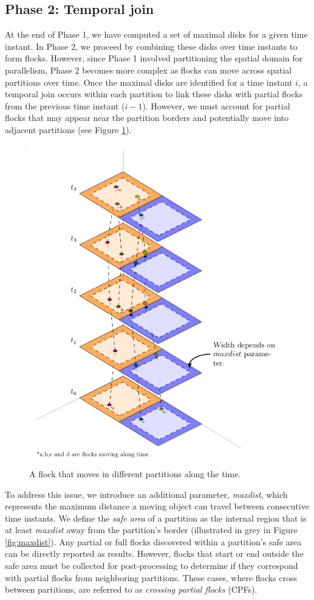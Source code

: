 \subsection{Phase 2: Temporal join}\label{sec:temporal_join}
At the end of Phase 1, we have computed a set of maximal disks for a given time instant. In Phase 2, we proceed by combining these disks over time instants to form flocks. However, since Phase 1 involved partitioning the spatial domain for parallelism, Phase 2 becomes more complex as flocks can move across spatial partitions over time. Once the maximal disks are identified for a time instant $i$, a temporal join occurs within each partition to link these disks with partial flocks from the previous time instant ($i-1$). However, we must account for partial flocks that may appear near the partition borders and potentially move into adjacent partitions (see Figure \ref{fig:simple_alternative}).

\begin{figure}
    \centering
    \includegraphics[width=0.8\linewidth]
    {pflocks_paper/figures/plots/11_temporal_partitions/TemporalPartitioning.pdf}
    \caption{A flock that moves in different partitions along the time.}\label{fig:simple_alternative}
\end{figure}


To address this issue, we introduce an additional parameter, \textit{maxdist}, which represents the maximum distance a moving object can travel between consecutive time instants. We define the \textit{safe area} of a partition as the internal region that is at least \textit{maxdist} away from the partition’s border (illustrated in grey in Figure \ref{fig:maxdist}). Any partial or full flocks discovered within a partition’s safe area can be directly reported as results. However, flocks that start or end outside the safe area must be collected for post-processing to determine if they correspond with partial flocks from neighboring partitions. These cases, where flocks cross between partitions, are referred to as \textit{crossing partial flocks} (CPFs).


